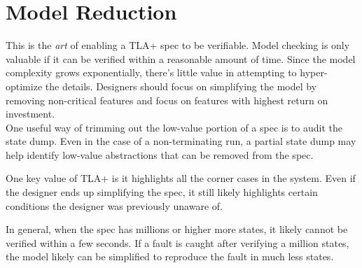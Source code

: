 \section{Model Reduction}

This is the \textit{art} of enabling a TLA+ spec to be verifiable. Model
checking is only valuable if it can be verified within a reasonable amount of
time. Since the model complexity grows exponentially, there's little value in
attempting to hyper-optimize the details.  Designers should focus on simplifying
the model by removing non-critical features and focus on features with highest
return on investment.\\

One useful way of trimming out the low-value portion of a spec is to audit the
state dump. Even in the case of a non-terminating run, a partial state dump may
help identify low-value abstractions that can be removed from the spec.\newline

One key value of TLA+ is it highlights all the corner cases in the system. Even
if the designer ends up simplifying the spec, it still likely highlights certain
conditions the designer was previously unaware of.\newline

In general, when the spec has millions or higher more states, it likely cannot 
be verified within a few seconds. If a fault is caught after verifying a million
states, the model likely can be simplified to reproduce the fault in much less
states.
